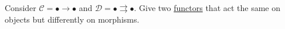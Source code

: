 Consider $\mathcal{C}=\boxed{\bullet \rightarrow \bullet}$ and $\mathcal{D}=\boxed{\bullet \rightrightarrows \bullet}$. Give two \hyperref[D3.35]{functors} that act the same on objects but differently on morphisms.